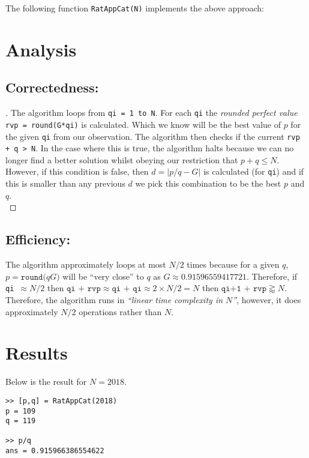 \documentclass[11pt]{report}
\begin{document}
The following function \texttt{RatAppCat(N)} implements the above approach:


\section{Analysis}
\subsection{Correctedness:}
\begin{proof}[\unskip\nopunct]
The algorithm loops from \texttt{qi = 1 to N}. For each \texttt{qi} the \textit{rounded perfect value} \texttt{rvp = round(G*qi)} is calculated. Which we know will be the best value of $p$ for the given \texttt{qi} from our observation. The algorithm then checks if the current \texttt{rvp + q > N}. In the case where this is true, the algorithm halts because we can no longer find a better solution whilst obeying our restriction that $p+q\leq N$. \\

However, if this condition is false, then $d=|p/q - G|$ is calculated (for \texttt{qi}) and if this is smaller than any previous $d$ we pick this combination to be the best $p$ and $q$. \\
\end{proof}

\subsection{Efficiency:}
The algorithm approximately loops at most $N/2$ times because for a given $q$, $p = \texttt{round(}qG\texttt{)}$ will be ``very close'' to $q$ as $G\approx 0.91596559417721$. Therefore, if \texttt{qi $\approx N/2$} then $\texttt{qi + rvp} \approx \texttt{qi + qi} \approx 2\times N/2 = N$ then $\texttt{qi+1 + rvp} \gtrapprox N$. \\

Therefore, the algorithm runs in \textit{``linear time complexity in $N$''}, however, it does approximately $N/2$ operations rather than $N$. 

\section{Results} 
Below is the result for $N=2018$. \\

\begin{lstlisting}[title={N=2018}]
>> [p,q] = RatAppCat(2018)
p = 109
q = 119

>> p/q 
ans = 0.915966386554622
\end{lstlisting}
\end{document}
